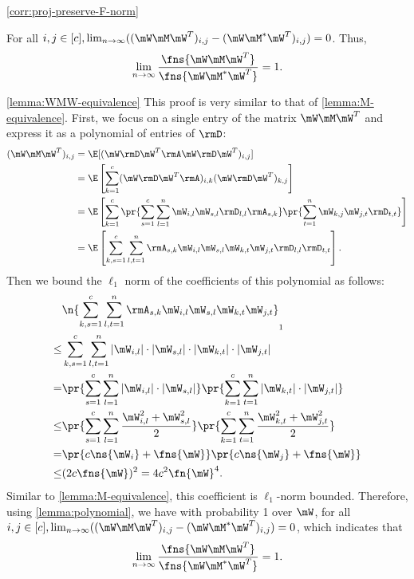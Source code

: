 \begin{proofof}{\cref{corr:proj-preserve-F-norm}}
\begin{lemma}
\label{lemma:WMW-equivalence}
For all $i,j\in[c], \lim_{n\to\infty}((\mW\mM\mW^T)_{i,j}-(\mW\mM^*\mW^T)_{i,j})=0$. Thus, \[\lim_{n\to\infty}\frac{\fns{\mW\mM\mW^T}}{\fns{\mW\mM^*\mW^T}}=1.\]
\end{lemma}
\begin{proofof}{\cref{lemma:WMW-equivalence}}
This proof is very similar to that of \cref{lemma:M-equivalence}. First, we focus on a single entry of the matrix $\mW\mM\mW^T$ and express it as a polynomial of entries of $\rmD$:
\begin{equation}
\begin{split}
(\mW\mM\mW^T)_{i,j} &= \E[(\mW\rmD\mW^T\rmA\mW\rmD\mW^T)_{i,j}]\\
              &= \E\left[\sum_{k=1}^c(\mW\rmD\mW^T\rmA)_{i,k}(\mW\rmD\mW^T)_{k,j}\right]\\
              &= \E\left[\sum_{k=1}^c\pr{\sum_{s=1}^c\sum_{l=1}^n\mW_{i,l}\mW_{s,l}\rmD_{l,l}\rmA_{s,k}}\pr{\sum_{t=1}^n\mW_{k,j}\mW_{j,t}\rmD_{t,t}}\right]\\
              &= \E\left[\sum_{k,s=1}^c\sum_{l,t=1}^n\rmA_{s,k}\mW_{i,l}\mW_{s,l}\mW_{k,t}\mW_{j,t}\rmD_{l,l}\rmD_{t,t}\right].
\end{split}
\end{equation}
Then we bound the $\ell_1$ norm of the coefficients of this polynomial as follows:
\begin{equation}
\begin{split}
    &\n{\sum_{k,s=1}^c\sum_{l,t=1}^n\rmA_{s,k}\mW_{i,l}\mW_{s,l}\mW_{k,t}\mW_{j,t}}_1\\
    \leq &\sum_{k,s=1}^c\sum_{l,t=1}^n|\mW_{i,l}|\cdot|\mW_{s,l}|\cdot|\mW_{k,t}|\cdot|\mW_{j,t}|\\
    =    &\pr{\sum_{s=1}^c\sum_{l=1}^n|\mW_{i,l}|\cdot|\mW_{s,l}|}\pr{\sum_{k=1}^c\sum_{t=1}^n|\mW_{k,t}|\cdot|\mW_{j,t}|}\\
    \leq &\pr{\sum_{s=1}^c\sum_{l=1}^n\frac{\mW_{i,l}^2+\mW_{s,l}^2}{2}}\pr{\sum_{k=1}^c\sum_{t=1}^n\frac{\mW_{k,t}^2+\mW_{j,t}^2}{2}}\\
    =    &\pr{c\ns{\mW_i}+\fns{\mW}}\pr{c\ns{\mW_j}+\fns{\mW}}\\
    \leq &(2c\fns{\mW})^2=4c^2\fn{\mW}^4.
\end{split}
\end{equation}
Similar to \cref{lemma:M-equivalence}, this coefficient is $\ell_1$-norm bounded. Therefore, using \cref{lemma:polynomial}, we have with probability 1 over $\mW$, for all $i,j\in[c], \lim_{n\to\infty}((\mW\mM\mW^T)_{i,j}-(\mW\mM^*\mW^T)_{i,j})=0$, which indicates that \[\lim_{n\to\infty}\frac{\fns{\mW\mM\mW^T}}{\fns{\mW\mM^*\mW^T}}=1.\]
\end{proofof}


\end{proofof}
